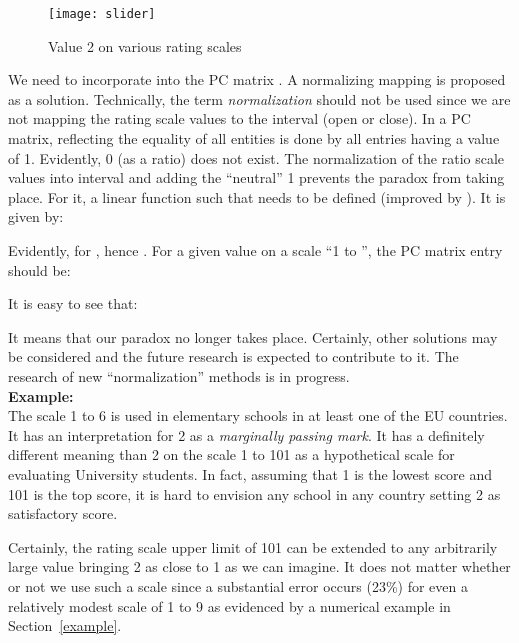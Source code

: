 \documentclass [12pt]{article}
\begin{document}
\begin{figure}[p]
\centering
\texttt{[image: slider]}
\caption[scale9]{Value 2 on various rating scales}
\label{fig:slider}
\end{figure}



We need to incorporate  into the PC matrix .
A normalizing mapping is proposed as a solution. Technically, the term
\textit{normalization} should not be used since we are not mapping the rating scale values
to the interval  (open or close). In a PC matrix, reflecting the equality of all entities is done by all entries having a value of 1. Evidently, 0 (as a ratio) does not exist.
The normalization of the ratio scale values into  interval and adding the ``neutral'' 1 prevents the paradox from taking place. For it, a linear function  such that  needs to be defined (improved by \cite{EW}). It is given by:



Evidently, for ,   hence .
For a given value  on a scale ``1 to '', the PC matrix entry should be:



\noindent It is easy to see that: 

 

It means that our  paradox no longer takes place. Certainly, other solutions may be considered and the future research is expected to contribute to it. The research of new ``normalization'' methods is in progress. \\

\noindent \textbf{Example:} \\

The scale 1 to 6 is used in elementary schools in at least one of the EU countries. It has an interpretation for 2 as a \textit{marginally passing mark}. It has a definitely different meaning than 2 on the scale 1 to 101 as a hypothetical scale for evaluating University students.
In fact, assuming that 1 is the lowest score and 101 is the top score, it is hard to envision any school in any country setting 2 as satisfactory
score.

Certainly, the rating scale upper limit of 101 can be extended to any arbitrarily large value bringing 2 as close to 1 as we can imagine. It does not matter whether or not we use such a scale since a substantial error occurs (23\%) for even a relatively modest scale of 1 to 9 as evidenced by a numerical example in Section~\ref{example}.\\
\end{document}
